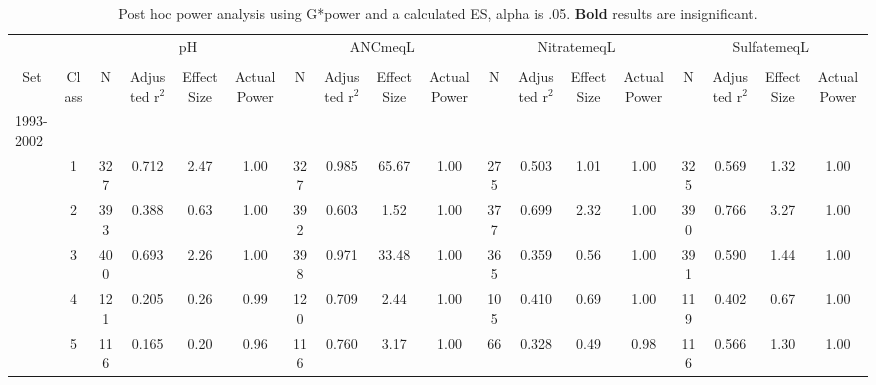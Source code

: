 \begin{sidewaystable}[p]\footnotesize
\caption{Post hoc power analysis using G*power and a calculated ES, alpha is .05.  \textbf{Bold} results are insignificant.}
\begin{tabular}{p{1cm}p{.5cm}cccccccccccccccc}
\hline\noalign{\smallskip}
\multicolumn{1}{c}{}&\multicolumn{1}{c}{}  & \multicolumn{4}{c}{pH} &\multicolumn{4}{c}{ ANCmeqL} & \multicolumn{4}{c}{ NitratemeqL} &  \multicolumn{4}{c}{SulfatemeqL}  \\ \cline{3-18}\noalign{\smallskip}
 & \multicolumn{ 1}{c}{} & \multicolumn{ 1}{c}{} &  \\ 
 \multicolumn{ 1}{c}{Set} & \multicolumn{ 1}{c}{Class} & \multicolumn{ 1}{c}{N} & \multicolumn{ 1}{p{1.2cm}}{Adjusted r$^2$} & \multicolumn{ 1}{p{1cm}}{Effect Size} & \multicolumn{ 1}{p{1cm}}{Actual Power} & \multicolumn{ 1}{c}{N} & \multicolumn{ 1}{p{1.2cm}}{Adjusted r$^2$} & \multicolumn{ 1}{p{1cm}}{Effect Size} & \multicolumn{ 1}{p{1cm}}{Actual Power} & \multicolumn{ 1}{c}{N} & \multicolumn{ 1}{p{1.2cm}}{Adjusted r$^2$} & \multicolumn{ 1}{p{1cm}}{Effect Size} & \multicolumn{ 1}{p{1cm}}{Actual Power} & \multicolumn{ 1}{c}{N} & \multicolumn{ 1}{p{1.2cm}}{Adjusted r$^2$} & \multicolumn{ 1}{p{1cm}}{Effect Size}& \multicolumn{1}{p{1cm}}{Actual Power} \\ \hline\noalign{\smallskip}
1993-2002\\
 & \multicolumn{1}{c}{1} & 327 & \multicolumn{ 1}{c}{0.712} & \multicolumn{ 1}{c}{2.47} & \multicolumn{ 1}{c}{1.00} & \multicolumn{ 1}{c}{327} & \multicolumn{ 1}{c}{0.985} & \multicolumn{ 1}{c}{65.67} & \multicolumn{ 1}{c}{1.00} & \multicolumn{ 1}{c}{275} & \multicolumn{ 1}{c}{0.503} & \multicolumn{ 1}{c}{1.01} & \multicolumn{ 1}{c}{1.00} & \multicolumn{ 1}{c}{325} & \multicolumn{ 1}{c}{0.569} & \multicolumn{ 1}{c}{1.32} & \multicolumn{ 1}{c}{1.00} \\ 
 & \multicolumn{ 1}{c}{2} & 393 & 0.388  & 0.63  & 1.00  & 392 & 0.603  & 1.52  & 1.00  & 377 & 0.699  & 2.32  & 1.00  & 390 & 0.766  & 3.27  & 1.00  \\ 
 & \multicolumn{ 1}{c}{3} & 400 & 0.693  & 2.26  & 1.00  & 398 & 0.971  & 33.48  & 1.00  & 365 & 0.359  & 0.56  & 1.00  & 391 & 0.590  & 1.44  & 1.00  \\ 
 & \multicolumn{ 1}{c}{4} & 121 & 0.205  & 0.26  & 0.99  & 120 & 0.709  & 2.44  & 1.00  & 105 & 0.410  & 0.69  & 1.00  & 119 & 0.402  & 0.67  & 1.00  \\ 
 & \multicolumn{ 1}{c}{5} & 116 & 0.165  & 0.20  & 0.96  & 116 & 0.760  & 3.17  & 1.00  & 66 & 0.328  & 0.49  & 0.98  & 116 & 0.566  & 1.30  & 1.00  \\ 

\end{tabular}
\end{sidewaystable}
